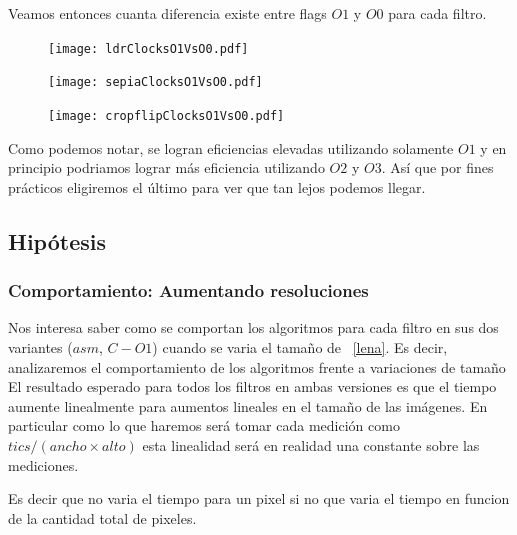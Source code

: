 Veamos entonces cuanta diferencia existe entre flags $O1$ y $O0$ para cada filtro.

\begin{figure}[h]
  \begin{center}
	\texttt{[image: ldrClocksO1VsO0.pdf]}
  \end{center}
\end{figure}

\begin{figure}[h]
  \begin{center}
	\texttt{[image: sepiaClocksO1VsO0.pdf]}
  \end{center}
\end{figure}
 
\begin{figure}[h]
  \begin{center}
	\texttt{[image: cropflipClocksO1VsO0.pdf]}
  \end{center}
\end{figure}
 
Como podemos notar, se logran eficiencias elevadas utilizando solamente $O1$ y en principio podriamos lograr más eficiencia utilizando $O2$ y $O3$. Así que por fines prácticos eligiremos el último para ver que tan lejos podemos llegar.\\ 
 
\subsection{Hipótesis}


\subsubsection{Comportamiento: Aumentando resoluciones}

Nos interesa saber como se comportan los algoritmos para cada filtro en sus dos variantes ($asm$, $C-O1$) cuando se varia el tamaño de ~\ref{lena}. Es decir, analizaremos el comportamiento de los algoritmos frente a variaciones de tamaño\\

El resultado esperado para todos los filtros en ambas versiones es que el tiempo aumente linealmente para aumentos lineales en el tamaño de las imágenes. En particular como lo que haremos será tomar cada medición como $tics /(ancho \times alto)$ esta linealidad será en realidad una constante sobre las mediciones. 

Es decir que no varia el tiempo para un pixel si no que varia el tiempo en funcion de la cantidad total de pixeles.

